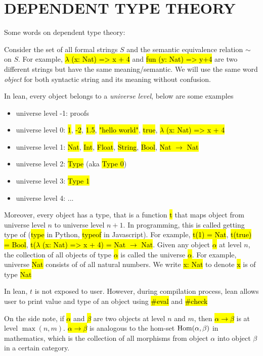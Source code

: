 \chapter{DEPENDENT TYPE THEORY}

Some words on dependent type theory:

Consider the set of all formal strings $S$ and the semantic equivalence relation $\sim$ on $S$. For example, \hl{$\lambda$ (x: Nat) => x + 4} and \hl{fun (y: Nat) => y+4} are two different strings but have the same meaning/semantic. We will use the same word \textit{object} for both syntactic string and its meaning without confusion.

In lean, every object belongs to a \textit{universe level}, below are some examples

\begin{itemize}
	\item universe level -1: proofs
	\item universe level 0: \hl{1}, \hl{-2}, \hl{1.5}, \hl{"hello world"}, \hl{true}, \hl{$\lambda$ (x: Nat) => x + 4}
	\item universe level 1: \hl{Nat}, \hl{Int}, \hl{Float}, \hl{String}, \hl{Bool}, \hl{Nat $\to$ Nat}
	\item universe level 2: \hl{Type} (aka \hl{Type 0})
	\item universe level 3: \hl{Type 1}
	\item universe level 4: ...
\end{itemize}

Moreover, every object has a type, that is a function \hl{t} that maps object from universe level $n$ to universe level $n+1$. In programming, this is called getting type of (\hl{type} in Python, \hl{typeof} in Javascript). For example, \hl{t(1) = Nat}, \hl{t(true) = Bool}, \hl{t($\lambda$ (x: Nat) => x + 4) = Nat $\to$ Nat}. Given any object \hl{$\alpha$} at level $n$, the collection of all objects of type \hl{$\alpha$} is called the universe \hl{$\alpha$}. For example, universe \hl{Nat} consists of of all natural numbers. We write \hl{x: Nat} to denote \hl{x} is of type \hl{Nat}

In lean, $t$ is not exposed to user. However, during compilation process, lean allows user to print value and type of an object using \hl{\#eval} and \hl{\#check}

On the side note, if \hl{$\alpha$} and \hl{$\beta$} are two objects at level $n$ and $m$, then \hl{$\alpha \to \beta$} is at level $\max(n, m)$. \hl{$\alpha \to \beta$} is analogous to the hom-set $\operatorname{Hom}(\alpha, \beta)$ in mathematics, which is the collection of all morphisms from object $\alpha$ into object $\beta$ in a certain category.




